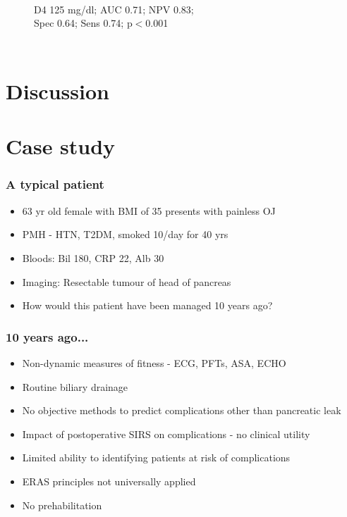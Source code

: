 \documentclass[10pt]{beamer}
\begin{document}
\begin{frame}
\begin{columns}
\begin{figure}
				\\{\scriptsize D4 125 mg/dl; AUC 0.71; NPV 0.83; \\Spec 0.64; Sens 0.74; p$<$0.001}
			\end{figure}
	\end{columns}
\end{frame}



\section[Chapter 7]{Discussion}



\section{Case study}
\begin{frame}
	\frametitle{A typical patient}
	\begin{itemize}
		\item 63 yr old female with BMI of 35 presents with painless OJ
		\item PMH - HTN, T2DM, smoked 10/day for 40 yrs
		\item Bloods: Bil 180, CRP 22, Alb 30
		\item Imaging: Resectable tumour of head of pancreas
		\item How would this patient have been managed 10 years ago?
	\end{itemize}
\end{frame}

\begin{frame}
	\frametitle{10 years ago...}
	\begin{itemize}
		\item Non-dynamic measures of fitness - ECG, PFTs, ASA, ECHO
		\item Routine biliary drainage
		\item No objective methods to predict complications other than pancreatic leak
		\item Impact of postoperative SIRS on complications - no clinical utility
		\item Limited ability to identifying patients at risk of complications
		\item ERAS principles not universally applied
		\item No prehabilitation
	\end{itemize}
\end{frame}
\end{document}
